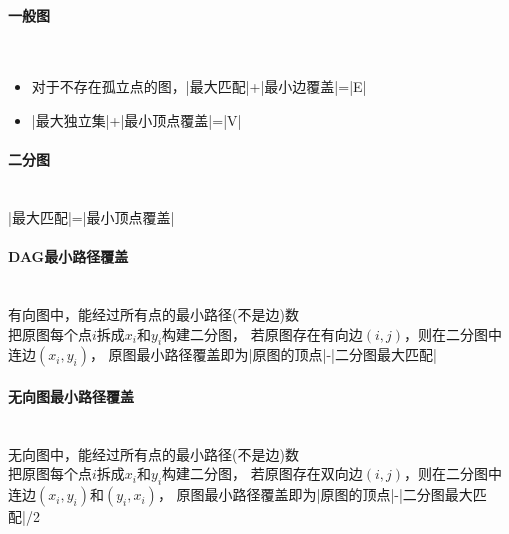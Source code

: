 \paragraph{一般图}~{}
\\
\begin{itemize}
\item 对于不存在孤立点的图，|最大匹配|+|最小边覆盖|=|E|
\item |最大独立集|+|最小顶点覆盖|=|V|
\end{itemize}

\paragraph{二分图}~{}
\\
|最大匹配|=|最小顶点覆盖|

\paragraph{DAG最小路径覆盖}~{}
\\
有向图中，能经过所有点的最小路径(不是边)数\\
把原图每个点$i$拆成$x_i$和$y_i$构建二分图，
若原图存在有向边$(i, j)$，则在二分图中连边$(x_i, y_i)$，
原图最小路径覆盖即为|原图的顶点|-|二分图最大匹配|

\paragraph{无向图最小路径覆盖}~{}
\\
无向图中，能经过所有点的最小路径(不是边)数\\
把原图每个点$i$拆成$x_i$和$y_i$构建二分图，
若原图存在双向边$(i, j)$，则在二分图中连边$(x_i, y_i)$和$(y_i, x_i)$，
原图最小路径覆盖即为|原图的顶点|-|二分图最大匹配|/2